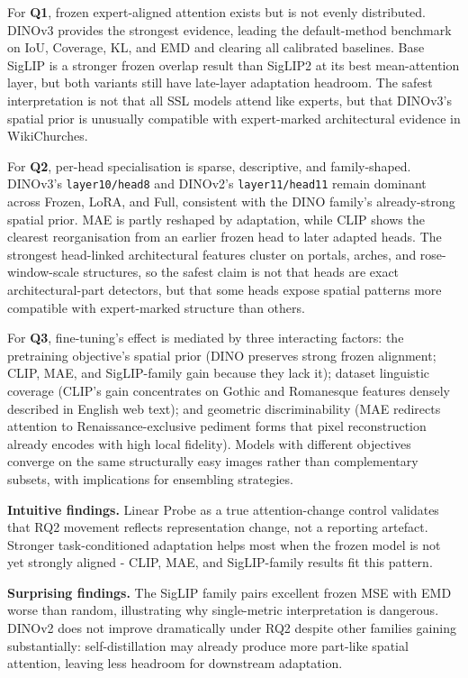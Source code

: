 \documentclass[lineno,pdflatex,sn-mathphys-num]{sn-jnl}%
\theoremstyle{thmstyleone}%
\theoremstyle{thmstyletwo}%
\theoremstyle{thmstylethree}%
\begin{document}
For \textbf{Q1}, frozen expert-aligned attention exists but is not evenly distributed. DINOv3 provides the strongest evidence, leading the default-method benchmark on IoU, Coverage, KL, and EMD and clearing all calibrated baselines. Base SigLIP is a stronger frozen overlap result than SigLIP2 at its best mean-attention layer, but both variants still have late-layer adaptation headroom. The safest interpretation is not that all SSL models attend like experts, but that DINOv3's spatial prior is unusually compatible with expert-marked architectural evidence in WikiChurches.

For \textbf{Q2}, per-head specialisation is sparse, descriptive, and family-shaped. DINOv3's \texttt{layer10/head8} and DINOv2's \texttt{layer11/head11} remain dominant across Frozen, LoRA, and Full, consistent with the DINO family's already-strong spatial prior. MAE is partly reshaped by adaptation, while CLIP shows the clearest reorganisation from an earlier frozen head to later adapted heads. The strongest head-linked architectural features cluster on portals, arches, and rose-window-scale structures, so the safest claim is not that heads are exact architectural-part detectors, but that some heads expose spatial patterns more compatible with expert-marked structure than others.

For \textbf{Q3}, fine-tuning's effect is mediated by three interacting factors: the pretraining objective's spatial prior (DINO preserves strong frozen alignment; CLIP, MAE, and SigLIP-family gain because they lack it); dataset linguistic coverage (CLIP's gain concentrates on Gothic and Romanesque features densely described in English web text); and geometric discriminability (MAE redirects attention to Renaissance-exclusive pediment forms that pixel reconstruction already encodes with high local fidelity). Models with different objectives converge on the same structurally easy images rather than complementary subsets, with implications for ensembling strategies.

\textbf{Intuitive findings.} Linear Probe as a true attention-change control validates that RQ2 movement reflects representation change, not a reporting artefact. Stronger task-conditioned adaptation helps most when the frozen model is not yet strongly aligned - CLIP, MAE, and SigLIP-family results fit this pattern.

\textbf{Surprising findings.} The SigLIP family pairs excellent frozen MSE with EMD worse than random, illustrating why single-metric interpretation is dangerous. DINOv2 does not improve dramatically under RQ2 despite other families gaining substantially: self-distillation may already produce more part-like spatial attention, leaving less headroom for downstream adaptation.
\end{document}
